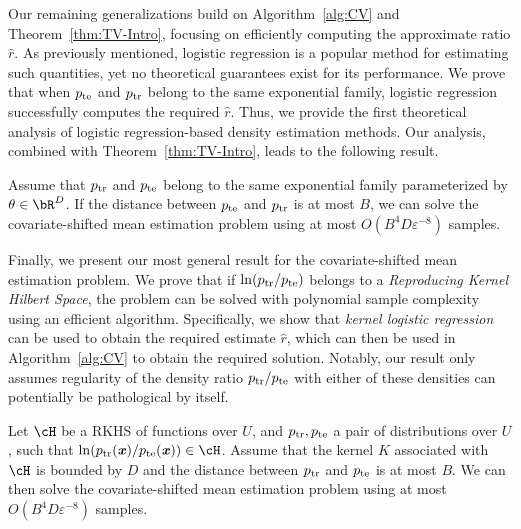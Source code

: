 Our remaining generalizations build on Algorithm~\ref{alg:CV} and Theorem~\ref{thm:TV-Intro}, focusing on efficiently computing the approximate ratio $\widehat{r}$. As previously mentioned, logistic regression is a popular method for estimating such quantities, yet no theoretical guarantees exist for its performance. We prove that when $p_{\mathrm{te}}$ and $p_{\mathrm{tr}}$ belong to the same exponential family, logistic regression successfully computes the required $\widehat{r}$. Thus, we provide the first theoretical analysis of logistic regression-based density estimation methods. Our analysis, combined with Theorem~\ref{thm:TV-Intro}, leads to the following result.


\begin{theorem}
      Assume that $p_{\mathrm{tr}}$ and $p_{\mathrm{te}}$ belong to the same exponential family parameterized by $\theta \in \bR^D$. If the distance between $p_{\mathrm{te}}$ and $p_{\mathrm{tr}}$ is at most $B$, we can solve the covariate-shifted mean estimation problem using at most $O(B^4 D \varepsilon^{-8})$ samples.
\end{theorem}


Finally, we present our most general result for the covariate-shifted mean estimation problem. We prove that if $\ln (p_{\mathrm{tr}}/p_{\mathrm{te}})$ belongs to a \emph{Reproducing Kernel Hilbert Space}, the problem can be solved with polynomial sample complexity using an efficient algorithm. Specifically, we show that \emph{kernel logistic regression} can be used to obtain the required estimate $\widehat{r}$, which can then be used in Algorithm~\ref{alg:CV} to obtain the required solution. Notably, our result only assumes regularity of the density ratio $p_{\mathrm{tr}}/p_{\mathrm{te}}$ with either of these densities can potentially be pathological by itself.

\begin{theorem}
    Let $\cH$ be a RKHS of functions over $U$, and $p_{\mathrm{tr}}, p_{\mathrm{te}}$ a pair of distributions over $U$, such that $\ln (\ptr(\xx) / \pte(\xx)) \in \cH$. Assume that the kernel $K$ associated with $\cH$ is bounded by $D$ and the distance between $p_{\mathrm{tr}}$ and $p_{\mathrm{te}}$ is at most $B$. We can then solve the covariate-shifted mean estimation problem using at most $O(B^4 D \varepsilon^{-8})$ samples.
\end{theorem}

